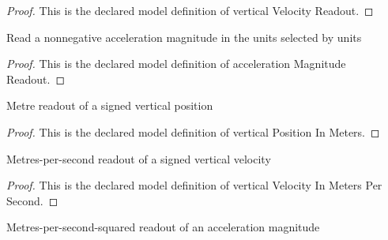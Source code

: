 \begin{proof}
  This is the declared model definition of vertical Velocity Readout.
\end{proof}
\begin{definition}
  \label{def:physics:phyx-mini-0754:phyxminiproblems-problemphyxmini0754-accelerationmagnitudereadout}
  Read a nonnegative acceleration magnitude in the units selected by units
\end{definition}
\begin{proof}
  This is the declared model definition of acceleration Magnitude Readout.
\end{proof}
\begin{definition}
  \label{def:physics:phyx-mini-0754:phyxminiproblems-problemphyxmini0754-verticalpositioninmeters}
  Metre readout of a signed vertical position
\end{definition}
\begin{proof}
  This is the declared model definition of vertical Position In Meters.
\end{proof}
\begin{definition}
  \label{def:physics:phyx-mini-0754:phyxminiproblems-problemphyxmini0754-verticalvelocityinmeterspersecond}
  Metres-per-second readout of a signed vertical velocity
\end{definition}
\begin{proof}
  This is the declared model definition of vertical Velocity In Meters Per Second.
\end{proof}
\begin{definition}
  \label{def:physics:phyx-mini-0754:phyxminiproblems-problemphyxmini0754-accelerationmagnitudeinmeterspersecondsquared}
  Metres-per-second-squared readout of an acceleration magnitude
\end{definition}
